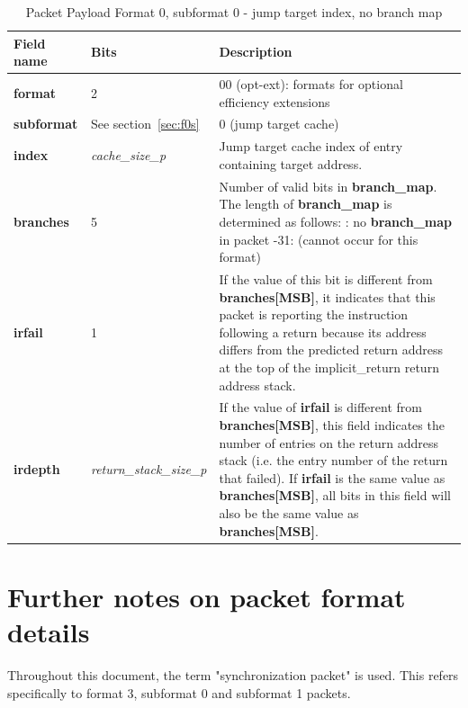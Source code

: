 \begin{table}[htp]
  \centering
  \caption{Packet Payload Format 0, subformat 0 - jump target index, no branch map}
  \label{tab:te_inst0-0-cache-nomap}
  \begin{tabulary}{\textwidth}{|l|p{35mm}|p{80mm}|}
    \hline
    {\bf Field name} & {\bf Bits} & {\bf Description} \\
    \hline
    \textbf{format}	& 2	& 00 (opt-ext): formats for optional efficiency extensions\\
    \hline
     \textbf{subformat}  & See section~\ref{sec:f0s} & 0 (jump target cache)\\
     \hline
    \textbf{index} & \textit {\textit{cache\_size\_p}} & 
              Jump target cache index of entry containing target address.\\ 
    \hline
    \textbf{branches} & 5 & Number of valid bits in \textbf{branch\_map}. The length of \textbf{branch\_map} is determined as follows: :    no \textbf{branch\_map} in packet -31: (cannot occur for this format) \\
    \hline
    \textbf{irfail}	& 1 & 
                If the value of this bit is different from \textbf{branches[MSB]}, it indicates that this
                packet is reporting the instruction following a return because its address differs from 
                the predicted return address at the top of the implicit\_return return address stack.\\
    \hline
    \textbf{irdepth}	& \textit {return\_stack\_size\_p} & 
                If the value of \textbf{irfail} is different from \textbf{branches[MSB]}, this field indicates 
                the number of entries on the return address stack (i.e. the entry number of the return that
                failed).  If \textbf{irfail} is the same value as \textbf{branches[MSB]}, all bits in this field 
                will also be the same value as \textbf{branches[MSB]}. \\
    \hline
  \end{tabulary}
\end{table}


\section {Further notes on packet format details}

Throughout this document, the term "synchronization packet" is used.  This refers specifically to format 3, 
subformat 0 and subformat 1 packets.

